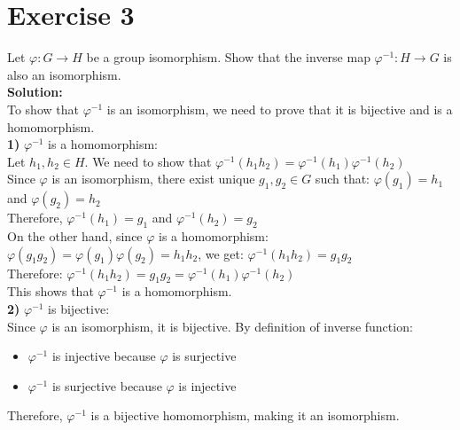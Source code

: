 \documentclass{article}
\begin{document}
\newpage

\section*{Exercise 3}
Let $\varphi: G \to H$ be a group isomorphism. Show that the inverse map $\varphi^{-1}: H \to G$ is also an isomorphism. \\

\textbf{Solution:} \\

To show that $\varphi^{-1}$ is an isomorphism, we need to prove that it is bijective and is a homomorphism. \\

\textbf{1) } $\varphi^{-1}$ is a homomorphism: \\

Let $h_1, h_2 \in H$. We need to show that $\varphi^{-1}(h_1h_2) = \varphi^{-1}(h_1)\varphi^{-1}(h_2)$ \\

Since $\varphi$ is an isomorphism, there exist unique $g_1, g_2 \in G$ such that:
$\varphi(g_1) = h_1$ and $\varphi(g_2) = h_2$ \\

Therefore, $\varphi^{-1}(h_1) = g_1$ and $\varphi^{-1}(h_2) = g_2$ \\

On the other hand, since $\varphi$ is a homomorphism:
$\varphi(g_1g_2) = \varphi(g_1)\varphi(g_2) = h_1h_2$, we get:
$\varphi^{-1}(h_1h_2) = g_1g_2$ \\

Therefore:
$\varphi^{-1}(h_1h_2) = g_1g_2 = \varphi^{-1}(h_1)\varphi^{-1}(h_2)$ \\

This shows that $\varphi^{-1}$ is a homomorphism. \\

\textbf{2) } $\varphi^{-1}$ is bijective: \\

Since $\varphi$ is an isomorphism, it is bijective. By definition of inverse function:
\begin{itemize}
    \item $\varphi^{-1}$ is injective because $\varphi$ is surjective
    \item $\varphi^{-1}$ is surjective because $\varphi$ is injective
\end{itemize}

Therefore, $\varphi^{-1}$ is a bijective homomorphism, making it an isomorphism.
\end{document}
